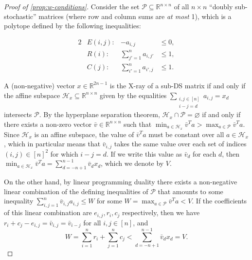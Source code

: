 \documentclass[letterpaper,reqno,11pt]{amsart}
\begin{document}
\begin{proof}[Proof of \cref{prop:w-conditions}]
    Consider the set $\mathcal{P}\subseteq \mathbb{R}^{n\times n}$ of all $n\times n$ ``doubly sub-stochastic'' matrices (where row and column sums are \emph{at most} 1), which is a polytope defined by the following inequalities: 
    
    \begin{alignat*}{2}
        &E(i,j):& -a_{i,j} &\leq 0,\\
        &R(i):& \sum_{j'=1}^n a_{i,j'} &\leq 1,\\
        &C(j):& \sum_{i'=1}^n a_{i',j} &\leq 1.
    \end{alignat*}

    A (non-negative) vector $x\in \mathbb{R}^{2n-1}$ is the X-ray of a sub-DS matrix if and only if the affine subspace $\mathcal{H}_x\subseteq \mathbb{R}^{n\times n}$ given by the equalities $\sum_{\substack{i, j\in [n]\\ i-j=d}} a_{i,j} = x_d$ intersects $\mathcal{P}$. By the hyperplane separation theorem, $\mathcal{H}_x\cap \mathcal{P} = \varnothing$ if and only if there exists a non-zero vector $\bar{v}\in \mathbb{R}^{n\times n}$ such that $\min_{a\in \mathcal{H}_x} \bar{v}^Ta > \max_{a\in \mathcal{P}} \bar{v}^Ta$. Since $\mathcal{H}_x$ is an affine subspace, the value of $\bar{v}^Ta$ must be constant over all $a\in \mathcal{H}_x$, which in particular means that $\bar{v}_{i,j}$ takes the same value over each set of indices $(i,j)\in [n]^2$ for which $i-j = d$. If we write this value as $\bar{v}_d$ for each $d$, then $\min_{a\in \mathcal{H}_x} \bar{v}^Ta = \sum_{d=-n+1}^{n-1} \bar{v}_dx_d$, which we denote by $V$.

    On the other hand, by linear programming duality there exists a non-negative linear combination of the defining inequalities of $\mathcal{P}$ that amounts to some inequality $\sum_{i,j=1}^n \bar{v}_{i,j} a_{i,j} \leq W$ for some $W = \max_{a\in \mathcal{P}} \bar{v}^Ta < V$. If the coefficients of this linear combination are $e_{i,j}, r_i, c_j$ respectively, then we have $r_i + c_j - e_{i,j} = \bar{v}_{i,j} = \bar{v}_{i-j}$ for all $i, j\in [n]$, and \[W = \sum_{i=1}^n r_i + \sum_{j=1}^n c_j < \sum_{d=-n+1}^{n-1} \bar{v}_dx_d = V.\]
    

\end{proof}
\end{document}

